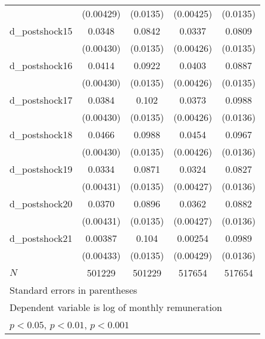 {\begin{tabular}{l*{4}{c}}
          &(0.00429)         & (0.0135)         &(0.00425)         & (0.0135)         \\
d\_postshock15&   0.0348\sym{***}&   0.0842\sym{***}&   0.0337\sym{***}&   0.0809\sym{***}\\
          &(0.00430)         & (0.0135)         &(0.00426)         & (0.0135)         \\
d\_postshock16&   0.0414\sym{***}&   0.0922\sym{***}&   0.0403\sym{***}&   0.0887\sym{***}\\
          &(0.00430)         & (0.0135)         &(0.00426)         & (0.0135)         \\
d\_postshock17&   0.0384\sym{***}&    0.102\sym{***}&   0.0373\sym{***}&   0.0988\sym{***}\\
          &(0.00430)         & (0.0135)         &(0.00426)         & (0.0136)         \\
d\_postshock18&   0.0466\sym{***}&   0.0988\sym{***}&   0.0454\sym{***}&   0.0967\sym{***}\\
          &(0.00430)         & (0.0135)         &(0.00426)         & (0.0136)         \\
d\_postshock19&   0.0334\sym{***}&   0.0871\sym{***}&   0.0324\sym{***}&   0.0827\sym{***}\\
          &(0.00431)         & (0.0135)         &(0.00427)         & (0.0136)         \\
d\_postshock20&   0.0370\sym{***}&   0.0896\sym{***}&   0.0362\sym{***}&   0.0882\sym{***}\\
          &(0.00431)         & (0.0135)         &(0.00427)         & (0.0136)         \\
d\_postshock21&  0.00387         &    0.104\sym{***}&  0.00254         &   0.0989\sym{***}\\
          &(0.00433)         & (0.0135)         &(0.00429)         & (0.0136)         \\
\hline
\(N\)     &   501229         &   501229         &   517654         &   517654         \\
\hline\hline
\multicolumn{5}{l}{\footnotesize Standard errors in parentheses}\\
\multicolumn{5}{l}{\footnotesize Dependent variable is log of monthly remuneration}\\
\multicolumn{5}{l}{\footnotesize \sym{*} \(p<0.05\), \sym{**} \(p<0.01\), \sym{***} \(p<0.001\)}\\
\end{tabular}
}
